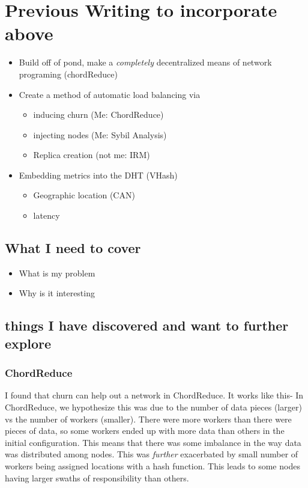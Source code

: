 
\chapter{Previous Writing to incorporate above}





\begin{itemize}
	\item Build off of pond, make a \textit{completely} decentralized means of network programing (chordReduce)
	\item Create a method of automatic load balancing via
	\begin{itemize}
		\item inducing churn (Me: ChordReduce)
		\item injecting nodes (Me: Sybil Analysis)
		\item Replica creation (not me: IRM)
	\end{itemize}
	\item Embedding metrics into the DHT (VHash)
    \begin{itemize}
        \item Geographic location (CAN)
        \item latency 
    \end{itemize}
\end{itemize}



\section{What I need to cover}

\begin{itemize}
	\item What is my problem
	\item Why is it interesting
\end{itemize}


\section{things I have discovered and want to further explore}


\subsection{ChordReduce}
I found that churn can help out a network in ChordReduce.
It works like this-
In ChordReduce, we hypothesize this was due to the number of data pieces (larger) vs the number of workers (smaller).
There were more workers than there were pieces of data, so some workers ended up with more data than others in the initial configuration.
This means that there was some imbalance in the way data was distributed among nodes.
This was \textit{further} exacerbated by small number of workers being assigned locations with a hash function.
This leads to some nodes having larger swaths of responsibility than others.


